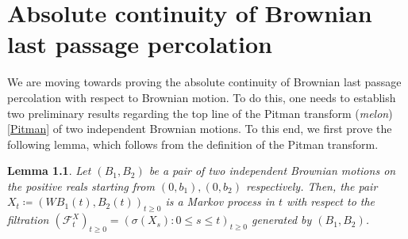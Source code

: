 \documentclass[12pt]{report}
\theoremstyle{plain}
\newtheorem{lemma}[theorem]{Lemma}
\begin{document}
\chapter{Absolute continuity of Brownian last passage percolation}

We are moving towards proving the absolute continuity of Brownian last passage percolation with respect to Brownian motion. To do this, one needs to establish two preliminary results regarding the top line of the Pitman transform (\textit{melon}) \ref{Pitman} of two independent Brownian motions. To this end, we first prove the following lemma, which follows from the definition of the Pitman transform.\\

\begin{lemma}\label{lemma: Pitman transform is Markov}
    Let $(B_1,B_2)$ be a pair of two independent Brownian motions on the positive reals starting from $(0,b_1), (0,b_2)$ respectively. Then, the pair $X_t \coloneqq (WB_1(t), B_2(t))_{t\geq 0}$ is a Markov process in $t$ with respect to the filtration $(\mathcal{F}_t^{X})_{t\geq0} = (\sigma(X_s):0\leq s\leq t)_{t\geq0}$ generated by $(B_1,B_2)$. 
\end{lemma}
\end{document}
